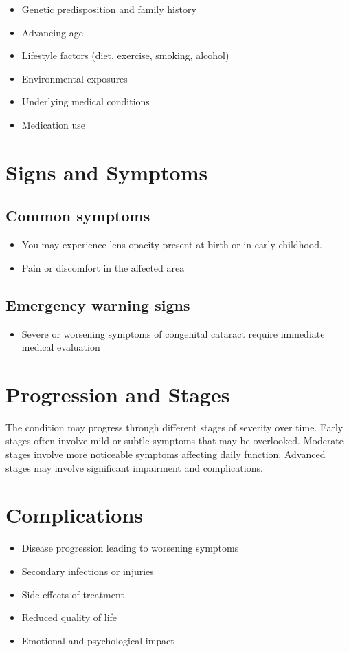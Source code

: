 \begin{itemize}[noitemsep]
  \item Genetic predisposition and family history
  \item Advancing age
  \item Lifestyle factors (diet, exercise, smoking, alcohol)
  \item Environmental exposures
  \item Underlying medical conditions
  \item Medication use
\end{itemize}
\section{Signs and Symptoms}

\subsection{Common symptoms}
\begin{itemize}[noitemsep]
  \item You may experience lens opacity present at birth or in early childhood.
  \item Pain or discomfort in the affected area
  \end{itemize}

\subsection{Emergency warning signs}
\begin{itemize}[noitemsep]
  \item Severe or worsening symptoms of congenital cataract require immediate medical evaluation
\end{itemize}
\section{Progression and Stages}
The condition may progress through different stages of severity over time. Early stages often involve mild or subtle symptoms that may be overlooked. Moderate stages involve more noticeable symptoms affecting daily function. Advanced stages may involve significant impairment and complications.
\section{Complications}
\begin{itemize}[noitemsep]
  \item Disease progression leading to worsening symptoms
  \item Secondary infections or injuries
  \item Side effects of treatment
  \item Reduced quality of life
  \item Emotional and psychological impact
\end{itemize}
